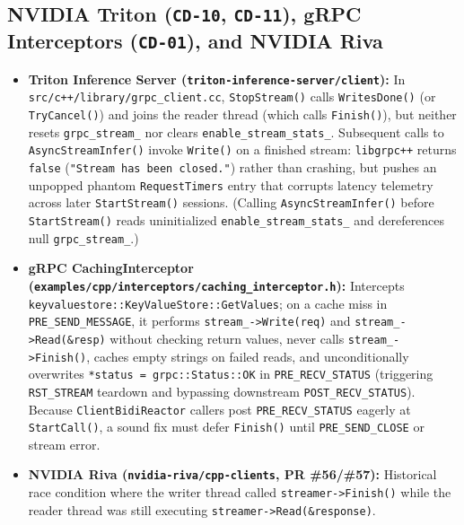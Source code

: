 \documentclass[11pt,a4paper]{article}
\begin{document}
\subsection{NVIDIA Triton (\texttt{CD-10}, \texttt{CD-11}), gRPC Interceptors (\texttt{CD-01}), and NVIDIA Riva}

\begin{itemize}
    \item \textbf{Triton Inference Server (\texttt{triton-inference-server/client}):} In \texttt{src/c++/library/grpc\_client.cc}, \texttt{StopStream()} calls \texttt{WritesDone()} (or \texttt{TryCancel()}) and joins the reader thread (which calls \texttt{Finish()}), but neither resets \texttt{grpc\_stream\_} nor clears \texttt{enable\_stream\_stats\_}. Subsequent calls to \texttt{AsyncStreamInfer()} invoke \texttt{Write()} on a finished stream: \texttt{libgrpc++} returns \texttt{false} (\texttt{"Stream has been closed."}) rather than crashing, but pushes an unpopped phantom \texttt{RequestTimers} entry that corrupts latency telemetry across later \texttt{StartStream()} sessions. (Calling \texttt{AsyncStreamInfer()} before \texttt{StartStream()} reads uninitialized \texttt{enable\_stream\_stats\_} and dereferences null \texttt{grpc\_stream\_}.)
    \item \textbf{gRPC CachingInterceptor (\texttt{examples/cpp/interceptors/caching\_interceptor.h}):} Intercepts \texttt{keyvaluestore::KeyValueStore::GetValues}; on a cache miss in \texttt{PRE\_SEND\_MESSAGE}, it performs \texttt{stream\_->Write(req)} and \texttt{stream\_->Read(\&resp)} without checking return values, never calls \texttt{stream\_->Finish()}, caches empty strings on failed reads, and unconditionally overwrites \texttt{*status = grpc::Status::OK} in \texttt{PRE\_RECV\_STATUS} (triggering \texttt{RST\_STREAM} teardown and bypassing downstream \texttt{POST\_RECV\_STATUS}). Because \texttt{ClientBidiReactor} callers post \texttt{PRE\_RECV\_STATUS} eagerly at \texttt{StartCall()}, a sound fix must defer \texttt{Finish()} until \texttt{PRE\_SEND\_CLOSE} or stream error.
    \item \textbf{NVIDIA Riva (\texttt{nvidia-riva/cpp-clients}, PR \#56/\#57):} Historical race condition where the writer thread called \texttt{streamer->Finish()} while the reader thread was still executing \texttt{streamer->Read(&response)}.
\end{itemize}
\end{document}
